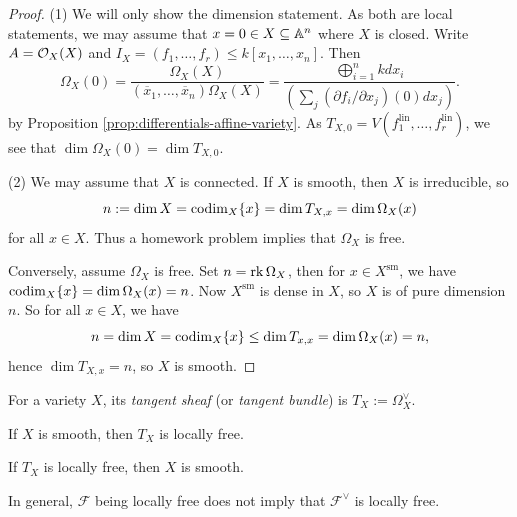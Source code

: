 \begin{proof}
  (1) We will only show the
  dimension statement.
  As both are local statements,
  we may assume that $x = 0 \in X \subseteq \mathbb{A}^n$
  where $X$
  is closed. Write $A = \mathcal{O}_X(X)$
  and $I_X = (f_1, \dots, f_r) \le k[x_1, \dots, x_n]$.
  Then
  \[
    \Omega_X(0)
    = \frac{\Omega_X(X)}{(\overline{x}_1, \dots, \overline{x}_n) \Omega_X(X)}
    = \frac{\bigoplus_{i = 1}^n k dx_i}{(\sum_j (\partial f_i / \partial x_j)(0) dx_j)}.
  \]
  by Proposition
  \ref{prop:differentials-affine-variety}.
  As $T_{X, 0} = V(f_1^{\mathrm{lin}}, \dots, f_r^{\mathrm{lin}})$,
  we see that $\dim \Omega_X(0) = \dim T_{X, 0}$.

  (2) We may assume that $X$ is connected.
  If $X$ is smooth, then $X$ is irreducible,
  so
  \[
    n := \dim X
    = \operatorname{codim}_X\{x\} = \dim T_{X, x}
    = \dim \Omega_X(x)
  \]
  for all $x \in X$. Thus a homework
  problem implies that $\Omega_X$ is
  free.

  Conversely, assume $\Omega_X$
  is free. Set $n = \operatorname{rk} \Omega_X$,
  then for $x \in X^{\mathrm{sm}}$,
  we have $\operatorname{codim}_X\{x\} = \dim \Omega_X(x) = n$.
  Now $X^{\mathrm{sm}}$ is dense in $X$,
  so $X$ is of pure dimension $n$.
  So for all $x \in X$, we have
  \[
    n = \dim X = \operatorname{codim}_X\{x\}
    \le \dim T_{x, x} = \dim \Omega_X(x)
    = n,
  \]
  hence $\dim T_{X, x} = n$, so $X$
  is smooth.
\end{proof}

\begin{definition}
  For a variety $X$, its \emph{tangent
  sheaf} (or \emph{tangent bundle}) is
  $T_X := \Omega_X^\vee$.
\end{definition}

\begin{remark}
  If $X$ is smooth, then $T_X$ is
  locally free.
\end{remark}

\begin{conjecture}
  If $T_X$ is locally free, then
  $X$ is smooth.
\end{conjecture}

\begin{remark}
  In general, $\mathcal{F}$ being
  locally free does not imply that
  $\mathcal{F}^\vee$ is locally free.
\end{remark}
